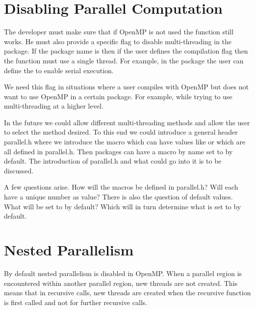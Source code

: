 \section{Disabling Parallel Computation\label{sec:disable_parallel}}
The developer must make sure that if OpenMP is not used the function
still works. He must also provide a specific flag to disable
multi-threading in the package. If the package name is  then
if the user defines the  compilation flag then
the function must use a single thread.
For example, in the  package the user
can define the  to enable
serial execution.

We need this flag in situations where a user compiles with OpenMP but
does not want to use OpenMP in a certain package. For example, while
trying to use multi-threading at a higher level.

In the future we could allow different multi-threading methods and
allow the user to select the method desired. To this end we could
introduce a general header parallel.h where we introduce the macro
 which can have values like
 or 
which are all defined in parallel.h. Then packages can have a macro by
name  set to
 by default.
The introduction of parallel.h and what could go into it is to be
discussed.

A few questions arise. How will the  macros be
defined in parallel.h? Will each have a unique number as value? There
is also the question of default values. What will
 be set to by default? Which will in turn
determine what  is set to by
default.

\section{Nested Parallelism\label{sec:nested_parallelism}}

By default nested parallelism is disabled in OpenMP. When a parallel
region is encountered within another parallel region, new threads are
not created. This means that in recursive calls, new threads are
created when the recursive function is first called and not for
further recursive calls.

